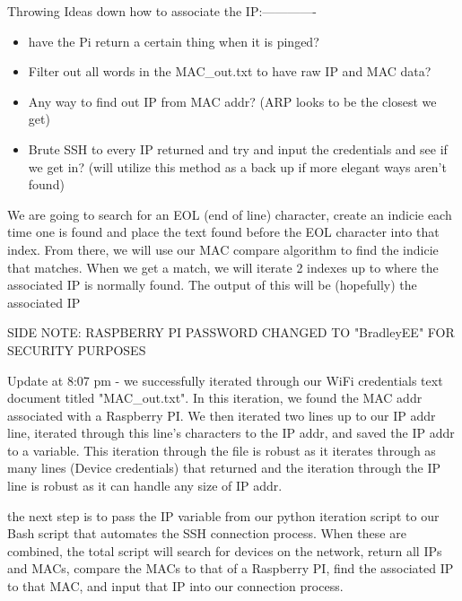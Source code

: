 \documentclass[fontsize=11pt, %
                             paper=letter, %
                             twoside, %
                             captions=tableheading,
                             index=totoc,
                             hyperref]{labbook}
\begin{document}
Throwing Ideas down how to associate the IP:-------------
\begin{itemize}
    \item have the Pi return a certain thing when it is pinged?
    \item Filter out all words in the MAC\_out.txt to have raw IP and MAC data? 
    \item Any way to find out IP from MAC addr? (ARP looks to be the closest we get)
    \item  Brute SSH to every IP returned and try and input the credentials and see if we get in? (will utilize this method as a back up if more elegant ways aren't found) 
\end{itemize}
    
We are going to search for an EOL (end of line) character, create an indicie each time one is found and place the text found before the EOL character into that index. From there, we will use our MAC compare algorithm to find the indicie that matches. When we get a match, we will iterate 2 indexes up to where the associated IP is normally found. The output of this will be (hopefully) the associated IP 

SIDE NOTE: RASPBERRY PI PASSWORD CHANGED TO "BradleyEE" FOR SECURITY PURPOSES 

Update at 8:07 pm - we successfully iterated through our WiFi credentials text document titled "MAC\_out.txt". In this iteration, we found the MAC addr associated with a Raspberry PI. We then iterated two lines up to our IP addr line, iterated through this line's characters to the IP addr, and saved the IP addr to a variable. This iteration through the file is robust as it iterates through as many lines (Device credentials) that returned and the iteration through the IP line is robust as it can handle any size of IP addr. 

the next step is to pass the IP variable from our python iteration script to our Bash script that automates the SSH connection process. When these are combined, the total script will search for devices on the network, return all IPs and MACs, compare the MACs to that of a Raspberry PI, find the associated IP to that MAC, and input that IP into our connection process. 
\end{document}
